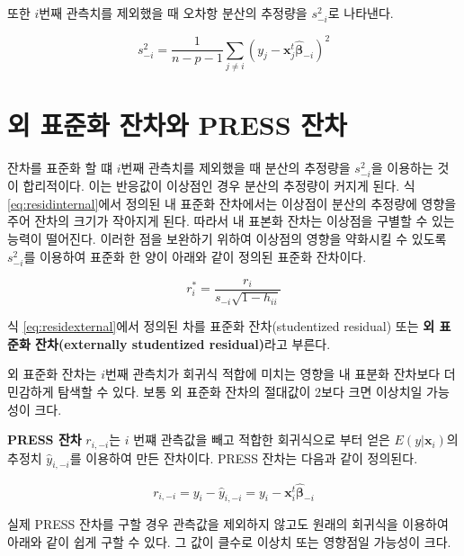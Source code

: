 \documentclass[
]{book}
\theoremstyle{definition}
\theoremstyle{definition}
\theoremstyle{definition}
\theoremstyle{definition}
\theoremstyle{remark}
\begin{document}
또한 \(i\)번째 관측치를 제외했을 때 오차항 분산의 추정량을 \(s^2_{-i}\)로
나타낸다.

\begin{equation}
 s^2_{-i} = \frac{1}{n-p-1} \sum_{j \ne i} (y_j - {\bm x}_j^t \hat{ \bm \beta}_{-i} )^2 
\label{eq:s2minusi}
\end{equation}

\hypertarget{uxc678-uxd45cuxc900uxd654-uxc794uxcc28uxc640-press-uxc794uxcc28}{%
\section{외 표준화 잔차와 PRESS 잔차}\label{uxc678-uxd45cuxc900uxd654-uxc794uxcc28uxc640-press-uxc794uxcc28}}

잔차를 표준화 할 떄 \(i\)번째 관측치를 제외했을 때 분산의 추정량을
\(s^2_{-i}\)을 이용하는 것이 합리적이다. 이는 반응값이 이상점인 경우
분산의 추정량이 커지게 된다. 식 \eqref{eq:residinternal}에서 정의된 내
표준화 잔차에서는 이상점이 분산의 추정량에 영향을 주어 잔차의 크기가
작아지게 된다. 따라서 내 표본화 잔차는 이상점을 구별할 수 있는 능력이
떨어진다. 이러한 점을 보완하기 위하여 이상점의 영향을 약화시킬 수 있도록
\(s^2_{-i}\)를 이용하여 표준화 한 양이 아래와 같이 정의된 표준화 잔차이다.

\begin{equation}
r^*_i = \frac{r_i}{s_{-i} \sqrt{1-h_{ii}}} 
\label{eq:residexternal}
\end{equation}

식 \eqref{eq:residexternal}에서 정의된 차를 표준화 잔차(studentized
residual) 또는 \textbf{외 표준화 잔차(externally studentized residual)}라고
부른다.

외 표준화 잔차는 \(i\)번째 관측치가 회귀식 적합에 미치는 영향을 내 표분화
잔차보다 더 민감하게 탐색할 수 있다. 보통 외 표준화 잔차의 절대값이
2보다 크면 이상치일 가능성이 크다.

\textbf{PRESS 잔차} \(r_{i,-i}\)는 \(i\) 번쨰 관측값을 빼고 적합한 회귀식으로
부터 얻은 \(E(y| \bm x_i)\)의 추정치 \(\hat y_{i,-i}\)를 이용하여 만든
잔차이다. PRESS 잔차는 다음과 같이 정의된다.

\begin{equation}
r_{i,-i}  =   y_i - \hat y_{i,-i} = y_i - \bm x^t_i \hat{ \bm \beta}_{-i} 
\label{eq:residpress}
\end{equation}

실제 PRESS 잔차를 구할 경우 관측값을 제외하지 않고도 원래의 회귀식을
이용하여 아래와 같이 쉽게 구할 수 있다. 그 값이 클수로 이상치 또는
영향점일 가능성이 크다.
\end{document}
